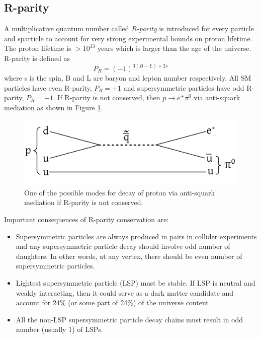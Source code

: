 \subsection{R-parity}
A multiplicative quantum number called \textit{R-parity} is introduced for every particle and sparticle to account for very strong 
experimental bounds on proton lifetime. The proton lifetime is $>10^{33}$ years \cite{PhysRevLett.102.141801} which is larger than the age 
of the universe.
R-parity is defined as
\begin{equation}
\label{eqn:rparity}
P_R = (-1)^{3(B-L)+2s}
\end{equation}
where s is the spin, B and L are baryon and lepton number respectively. All SM particles have even R-parity, $P_R=+1$ and 
supersymmetric particles have odd R-parity, $P_R=-1$. If R-parity is not conserved, then $p\to e^+\pi^{0}$ via anti-squark mediation as 
shown in Figure \ref{fig:protonDecay}.
\begin{figure}[h!]
\centering
\includegraphics[width=0.7\linewidth]{../Figures/Chap1/protonDecay}
\caption[Proton decay diagram]{One of the possible modes for decay of proton via anti-squark mediation if R-parity is not conserved.}
\label{fig:protonDecay}
\end{figure}

Important consequences \cite{Martin:1997ns} of R-parity conservation are:
\begin{itemize}
\item Supersymmetric particles are always produced in pairs in collider experiments
and any supersymmetric particle decay should involve odd number of daughters.
In other words, at any vertex, there should be even number of supersymmetric particles.
\item Lightest supersymmetric particle (LSP) must be stable. If LSP is neutral and weakly interacting, then it could serve as a dark matter 
candidate and account for 24\% (or some part of 24\%) of the universe content \cite{ELLIS1984453}.
\item All the non-LSP supersymmetric particle decay chains must result in odd number (usually 1) of LSPs.
\end{itemize}

